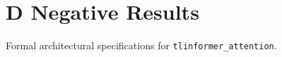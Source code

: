 \section{D Negative Results}

Formal architectural specifications for \texttt{tlinformer_attention}.
